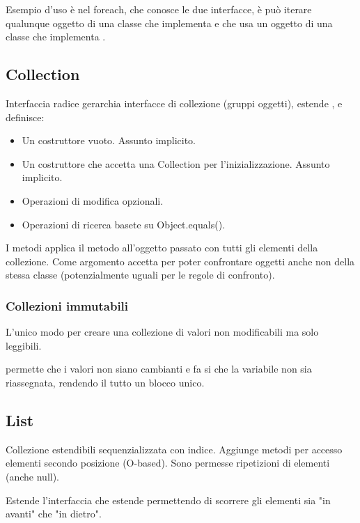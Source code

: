 Esempio d'uso è nel foreach, che conosce le due interfacce, è può iterare qualunque oggetto di una classe che implementa  e che usa un oggetto di una classe che implementa .

\subsection{Collection}
Interfaccia radice gerarchia interfacce di collezione (gruppi oggetti), estende , e definisce:
\begin{itemize}
	\item Un costruttore vuoto. Assunto implicito.
	\item Un costruttore che accetta una Collection per l'inizializzazione. Assunto implicito.
	\item Operazioni di modifica opzionali.
	\item Operazioni di ricerca basete su Object.equals().
\end{itemize}


I metodi  applica il metodo  all'oggetto passato con tutti gli elementi della collezione.
Come argomento accetta  per poter confrontare oggetti anche non della stessa classe (potenzialmente uguali per le regole di confronto).

\subsubsection{Collezioni immutabili}
L'unico modo per creare una collezione di valori non modificabili ma solo leggibili.



 permette che i valori non siano cambianti e  fa si che la variabile non sia riassegnata, rendendo il tutto un blocco unico.

\subsection{List}
Collezione estendibili sequenzializzata con indice. Aggiunge metodi per accesso elementi secondo posizione (O-based). Sono permesse ripetizioni di elementi (anche null).

Estende l'interfaccia  che estende  permettendo di scorrere gli elementi sia "in avanti" che "in dietro".

